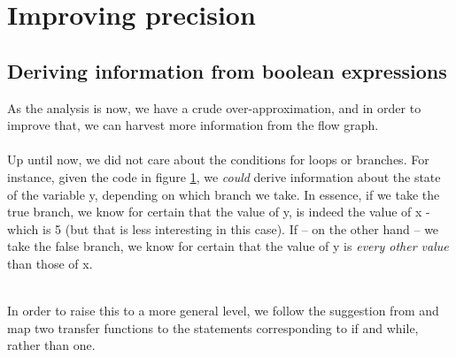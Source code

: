 \section{Improving precision}
\subsection{Deriving information from boolean expressions}
As the analysis is now, we have a crude over-approximation, and in order to improve that, we can harvest more information from the flow graph.\\\\
Up until now, we did not care about the conditions for loops or branches. For instance, given the code in figure \ref{fig:if_flow_example}, we \emph{could} derive information about the state of the variable y, depending on which branch we take. In essence, if we take the true branch, we know for certain that the value of y, is indeed the value of x - which is 5 (but that is less interesting in this case). If -- on the other hand -- we take the false branch, we know for certain that the value of y is \emph{every other value} than those of x.\\\\
\begin{figure}[h]
\centering
{}
 \caption{}
 \label{fig:if_flow_example}
\end{figure} In order to raise this to a more general level, we follow the suggestion from \cite{02242_slides} and map two transfer functions to the statements corresponding to if and while, rather than one.


